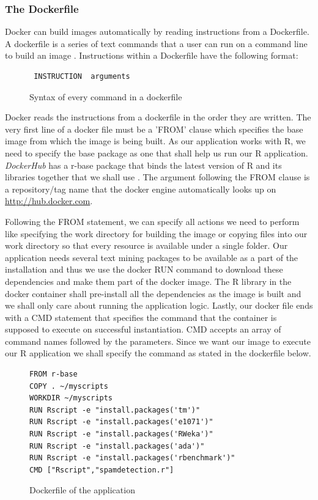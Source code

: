 \documentclass[9pt,twocolumn,twoside]{../../styles/osajnl}
\begin{document}
\subsubsection{The Dockerfile}
Docker can build images automatically by reading instructions from a
Dockerfile. A dockerfile is a series of text commands that a user can
run on a command line to build an image \cite{www-dockerfile-documentation}.
\newline
Instructions within a Dockerfile have the following format:
\begin{figure}[H]
\begin{verbatim}
 INSTRUCTION  arguments
\end{verbatim}
\caption{Syntax of every command in a dockerfile}
\label{Syntax of every command in a dockerfile}
\end{figure}

Docker reads the instructions from a dockerfile in the order they are
written. The very first line of a docker file must be a 'FROM' clause
which specifies the base image from which the image is being built. As
our application works with R, we need to specify the base package as
one that shall help us run our R application. \emph{DockerHub} has a
r-base package that binds the latest version of R and its libraries
together that we shall use \cite{www-rbase-docker}.  The argument
following the FROM clause is a repository/tag name that the docker
engine automatically looks up on \url{http://hub.docker.com}.

Following the FROM statement, we can specify all actions we need to
perform like specifying the work directory for building the image or
copying files into our work directory so that every resource is
available under a single folder. Our application needs several text
mining packages to be available as a part of the installation and thus
we use the docker RUN command to download these dependencies and make
them part of the docker image. The R library in the docker container
shall pre-install all the dependencies as the image is built and we
shall only care about running the application logic. Lastly, our
docker file ends with a CMD statement that specifies the command that
the container is supposed to execute on successful instantiation. CMD
accepts an array of command names followed by the parameters. Since we
want our image to execute our R application we shall specify the command
as stated in the dockerfile below.

\begin{figure}[H]
\begin{verbatim}
FROM r-base
COPY . ~/myscripts
WORKDIR ~/myscripts
RUN Rscript -e "install.packages('tm')"
RUN Rscript -e "install.packages('e1071')"
RUN Rscript -e "install.packages('RWeka')"
RUN Rscript -e "install.packages('ada')"
RUN Rscript -e "install.packages('rbenchmark')"
CMD ["Rscript","spamdetection.r"]
\end{verbatim}
\caption{Dockerfile of the application}
\label{Dockerfile of the application}
\end{figure}
\end{document}
